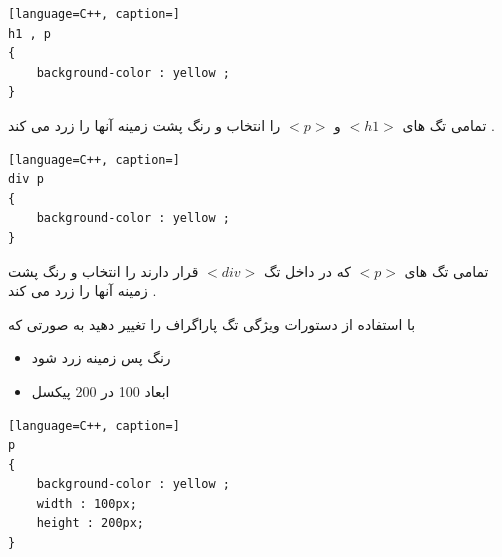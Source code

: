 \documentclass[12pt]{article}
\begin{document}
\vspace{60pt}


\begin{latin}
\begin{lstlisting}[language=C++, caption=]
h1 , p 
{
	background-color : yellow ;
}
\end{lstlisting}
\end{latin}







تمامی تگ های 
$<h1>$
و
$<p>$
را انتخاب و رنگ پشت زمینه آنها را زرد می کند .



\vspace{60pt}


\begin{latin}
\begin{lstlisting}[language=C++, caption=]
div p 
{
	background-color : yellow ;
}
\end{lstlisting}
\end{latin}
 
 

تمامی تگ های 
$<p>$
که در داخل تگ
$<div>$
قرار دارند را انتخاب و رنگ پشت زمینه آنها را زرد می کند .




\newpage
 
\vspace{20pt}

\noindent
با استفاده از دستورات
ویژگی تگ پاراگراف را تغییر دهید به صورتی که 
\begin{itemize}
	\item رنگ پس زمینه زرد شود
	\item ابعاد 100 در 200 پیکسل
\end{itemize}




\begin{latin}
\begin{lstlisting}[language=C++, caption=]
p 
{
	background-color : yellow ;
	width : 100px;
	height : 200px;
}
\end{lstlisting}
\end{latin}
\end{document}
